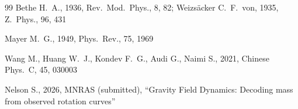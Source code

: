 \documentclass[fleqn,usenatbib]{mnras}
\begin{document}
\begin{thebibliography}{99}
Bethe H.~A., 1936, Rev.\ Mod.\ Phys., 8, 82; Weizs\"acker C.~F.~von, 1935, Z.\ Phys., 96, 431

Mayer M.~G., 1949, Phys.\ Rev., 75, 1969

Wang M., Huang W.~J., Kondev F.~G., Audi G., Naimi S., 2021, Chinese Phys.\ C, 45, 030003

Nelson S., 2026, MNRAS (submitted), ``Gravity Field Dynamics: Decoding mass from observed rotation curves''
\end{thebibliography}
\end{document}
